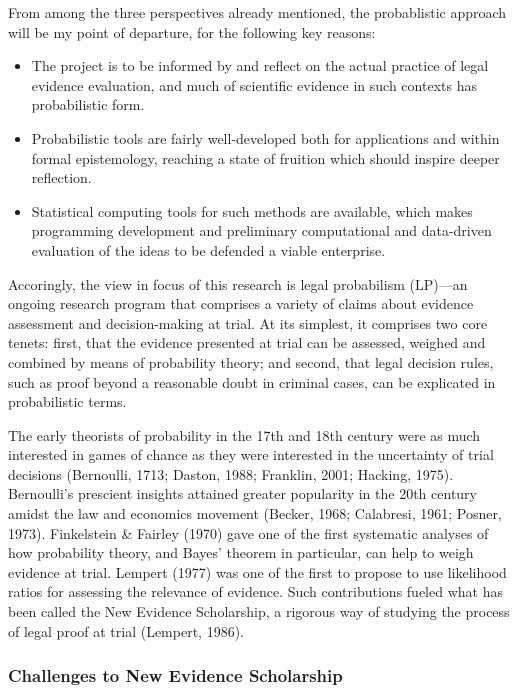\documentclass[11pt,dvipsnames,enabledeprecatedfontcommands]{scrartcl}
\begin{document}
From among the three perspectives already mentioned, the probablistic
approach will be my point of departure, for the following key reasons:

\begin{itemize}
\item
  The project is to be informed by and reflect on the actual practice of
  legal evidence evaluation, and much of scientific evidence in such
  contexts has probabilistic form.
\item
  Probabilistic tools are fairly well-developed both for applications
  and within formal epistemology, reaching a state of fruition which
  should inspire deeper reflection.
\item
  Statistical computing tools for such methods are available, which
  makes programming development and preliminary computational and
  data-driven evaluation of the ideas to be defended a viable
  enterprise.
\end{itemize}

Accoringly, the view in focus of this research is legal probabilism
(LP)---an ongoing research program that comprises a variety of claims
about evidence assessment and decision-making at trial. At its simplest,
it comprises two core tenets: first, that the evidence presented at
trial can be assessed, weighed and combined by means of probability
theory; and second, that legal decision rules, such as proof beyond a
reasonable doubt in criminal cases, can be explicated in probabilistic
terms.

The early theorists of probability in the 17th and 18th century were as
much interested in games of chance as they were interested in the
uncertainty of trial decisions (Bernoulli, 1713; Daston, 1988; Franklin,
2001; Hacking, 1975). Bernoulli's prescient insights attained greater
popularity in the 20th century amidst the law and economics movement
(Becker, 1968; Calabresi, 1961; Posner, 1973). Finkelstein \& Fairley
(1970) gave one of the first systematic analyses of how probability
theory, and Bayes' theorem in particular, can help to weigh evidence at
trial. Lempert (1977) was one of the first to propose to use likelihood
ratios for assessing the relevance of evidence. Such contributions
fueled what has been called the New Evidence Scholarship, a rigorous way
of studying the process of legal proof at trial (Lempert, 1986).

\hypertarget{challenges-to-new-evidence-scholarship}{%
\subsubsection{Challenges to New Evidence
Scholarship}\label{challenges-to-new-evidence-scholarship}}
\end{document}
